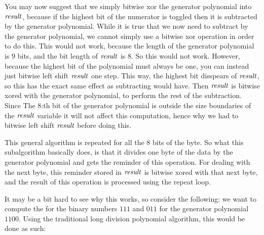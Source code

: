 You may now suggest that we simply bitwise xor the generator
polynomial into $\mathit{result}$, because if the highest bit of the numerator
is toggled then it is subtracted by the generator polynomial. While it
is true that we now need to subtract by the generator polynomial, we
cannot simply use a bitwise xor operation in order to do this. This
would not work, because the length of the generator polynomial is $9$
bits, and the bit length of $\mathit{result}$ is $8$. So this would not
work. However, because the highest bit of the polynomial must always
be one, you can instead just bitwise left shift $\mathit{result}$ one
step. This way, the highest bit disspears of $\mathit{result}$, so this has the
exact same effect as subtracting would have. Then $\mathit{result}$ is bitwise
xored with the generator polynomial, to perform the rest of the
subtraction. Since The $8$:th bit of the generator polynomial is
outside the size boundaries of the $\mathit{result}$ variable it will not
affect this computation, hence why we had to bitwise left shift
$\mathit{result}$ before doing this.

This general algorithm is repeated for all the 8 bits of the byte. So
what this subalgorithm basically does, is that it divides one byte of
the data by the generator polynomial and gets the reminder of this
operation. For dealing with the next byte, this reminder stored in
$\mathit{result}$ is bitwise xored with that next byte, and the result of this
operation is processed using the repeat loop.

It may be a bit hard to see why this works, so consider the following:
we want to compute the \crc for the binary numbers $111$ and $011$ for
the generator polynomial $1100$. Using the traditional long division
polynomial algorithm, this would be done as such:

